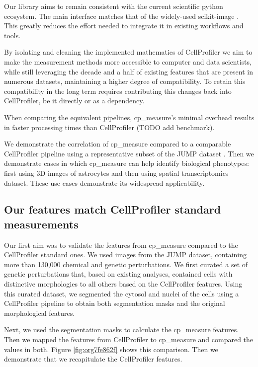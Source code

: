 \documentclass{article}
\begin{document}
Our library aims to remain consistent with the current scientific python ecosystem. The main interface matches that of the widely-used scikit-image \citep{waltScikitimageImageProcessing2014}. This greatly reduces the effort needed to integrate it in existing workflows and tools.

By isolating and cleaning the implemented mathematics of CellProfiler we aim to make the measurement methods more accessible to computer and data scientists, while still leveraging the decade and a half of existing features that are present in numerous datasets, maintaining a higher degree of compatibility. To retain this compatibility in the long term requires contributing this changes back into CellProfiler, be it directly or as a dependency.

When comparing the equivalent pipelines, cp\_measure's minimal overhead results in faster processing times than CellProfiler (TODO add benchmark).

We demonstrate the correlation of cp\_measure compared to a comparable CellProfiler pipeline using a representative subset of the JUMP dataset \citep{chandrasekaranJUMPCellPainting2023}. Then we demonstrate cases in which cp\_measure can help identify biological phenotypes: first using 3D images of astrocytes and then using spatial transcriptomics dataset. These use-cases demonstrate its widespread applicability. 
\subsection{Our features match CellProfiler standard measurements}
\label{sec:org04a138e}

Our first aim was to validate the features from cp\_measure compared to the CellProfiler standard ones. We used images from the JUMP dataset, containing more than 130,000 chemical and genetic perturbations. We first curated a set of genetic perturbations that, based on existing analyses, contained cells with distinctive morphologies to all others based on the CellProfiler features. Using this curated dataset, we segmented the cytosol and nuclei of the cells using a CellProfiler pipeline to obtain both segmentation masks and the original morphological features.

Next, we used the segmentation masks to calculate the cp\_measure features. Then we mapped the features from CellProfiler to cp\_measure and compared the values in both. Figure \ref{fig:org7fe862f} shows this comparison. Then we demonstrate that we recapitulate the CellProfiler features.
\end{document}
